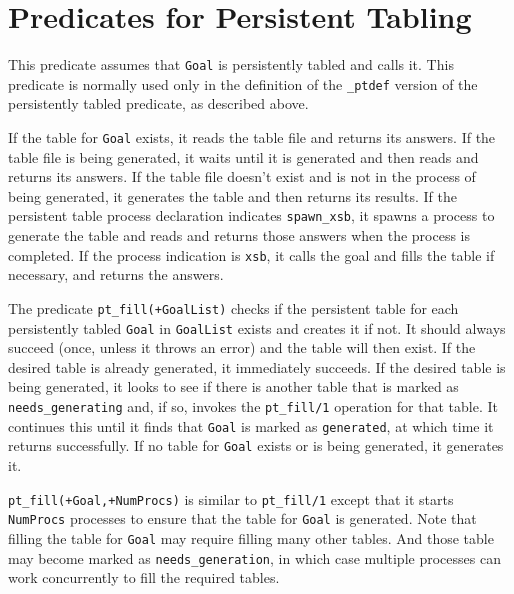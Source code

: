 \section{Predicates for Persistent Tabling}

\begin{description}

%
This predicate assumes that {\tt Goal} is persistently tabled and
calls it.  This predicate is normally used only in the definition of
the {\tt \_ptdef} version of the persistently tabled predicate, as
described above.

If the table for {\tt Goal} exists, it reads the table file and
returns its answers.  If the table file is being generated, it waits
until it is generated and then reads and returns its answers.  If the
table file doesn't exist and is not in the process of being generated,
it generates the table and then returns its results.  If the persistent
table process declaration indicates {\tt spawn\_xsb}, it spawns a
process to generate the table and reads and returns those answers when
the process is completed.  If the process indication is {\tt xsb}, it
calls the goal and fills the table if necessary, and returns the
answers.  

%
The predicate {\tt pt\_fill(+GoalList)} checks
if the persistent table for each persistently tabled {\tt Goal} in
{\tt GoalList} exists and creates it if not.  It should always succeed
(once, unless it throws an error) and the table will then exist.  If
the desired table is already generated, it immediately succeeds.  If
the desired table is being generated, it looks to see if there is
another table that is marked as {\tt needs\_generating} and, if so,
invokes the {\tt pt\_fill/1} operation for that table.  It continues
this until it finds that {\tt Goal} is marked as {\tt generated}, at
which time it returns successfully.  If no table for {\tt Goal} exists
or is being generated, it generates it.  

%
{\tt pt\_fill(+Goal,+NumProcs)} is similar to
{\tt pt\_fill/1} except that it starts {\tt NumProcs} processes to
ensure that the table for {\tt Goal} is generated.  Note that filling
the table for {\tt Goal} may require filling many other tables.  And
those table may become marked as {\tt needs\_generation}, in which case
multiple processes can work concurrently to fill the required tables.



\end{description}
